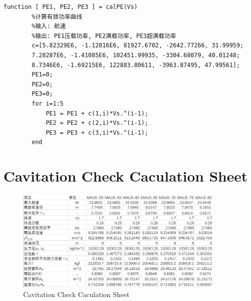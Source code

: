 \documentclass[a4paper,UTF8]{article}
\begin{document}
\begin{appendices}
\begin{lstlisting}[caption={Caculate Cruising Characteristics}]
		function [ PE1, PE2, PE3 ] = calPE(Vs)
		%计算有效功率曲线
		%输入: 航速
		%输出: PE1压载功率, PE2满载功率, PE3超满载功率
		c=[5.82329E6, -1.12816E6, 81927.6702, -2642.77266, 31.99959;
		7.28287E6, -1.41085E6, 102451.99935, -3304.68079, 40.01248;
		8.7346E6, -1.69215E6, 122883.80611, -3963.87495, 47.99561];
		PE1=0;
		PE2=0;  
		PE3=0;
		for i=1:5
			PE1 = PE1 + c(1,i)*Vs.^(i-1);
			PE2 = PE2 + c(2,i)*Vs.^(i-1);
			PE3 = PE3 + c(3,i)*Vs.^(i-1);
		end
	\end{lstlisting}
	
	
	\section{Cavitation Check Caculation Sheet}
	\begin{figure}[!htbp]
		\centering
		\includegraphics[width=4in]{figure/cavitation_check_sheet.png}
		\caption{Cavitation Check Caculation Sheet}
		\label{fig:cavichecksheet}
	\end{figure}
\end{appendices}
\label{last}  
\end{document}
